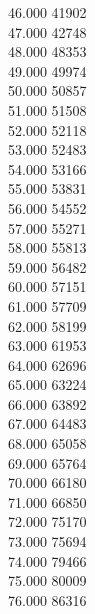 { 46.000	41902 \\
 47.000	42748 \\
 48.000	48353 \\
 49.000	49974 \\
 50.000	50857 \\
 51.000	51508 \\
 52.000	52118 \\
 53.000	52483 \\
 54.000	53166 \\
 55.000	53831 \\
 56.000	54552 \\
 57.000	55271 \\
 58.000	55813 \\
 59.000	56482 \\
 60.000	57151 \\
 61.000	57709 \\
 62.000	58199 \\
 63.000	61953 \\
 64.000	62696 \\
 65.000	63224 \\
 66.000	63892 \\
 67.000	64483 \\
 68.000	65058 \\
 69.000	65764 \\
 70.000	66180 \\
 71.000	66850 \\
 72.000	75170 \\
 73.000	75694 \\
 74.000	79466 \\
 75.000	80009 \\
 76.000	86316 \\
}
